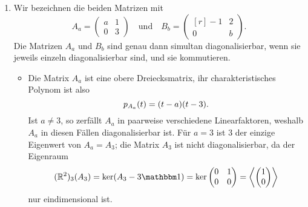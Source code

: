 \documentclass[a4paper, 10pt]{scrartcl}
\begin{document}
\begin{solution}
\begin{enumerate}
    \item
      Wir bezeichnen die beiden Matrizen mit
      \[
          A_a
        = \begin{pmatrix}
            a & 1 \\
            0 & 3
          \end{pmatrix}
        \quad\text{und}\quad
          B_b
        = \begin{pmatrix*}[r]
            -1  & 2 \\
             0  & b
          \end{pmatrix*}.
      \]
      Die Matrizen $A_a$ und $B_b$ sind genau dann simultan diagonalisierbar, wenn sie jeweils einzeln diagonalisierbar sind, und sie kommutieren.
      \begin{itemize}
        \item
          Die Matrix $A_a$ ist eine obere Dreiecksmatrix, ihr charakteristisches Polynom ist also
          \[
              p_{A_a}(t)
            = (t-a)(t-3).
          \]
          Ist $a \neq 3$, so zerfällt $A_a$ in paarweise verschiedene Linearfaktoren, weshalb $A_a$ in diesen Fällen diagonalisierbar ist.
          Für $a = 3$ ist $3$ der einzige Eigenwert von $A_a = A_3$;
          die Matrix $A_3$ ist nicht diagonalisierbar, da der Eigenraum
          \[
              \eigenspace{(\Real^2)}{A_3}{3}
            = \ker (A_3 - 3 \Id)
            = \ker \begin{pmatrix}
                     0 & 1  \\
                     0 & 0
                   \end{pmatrix}
            = \generated{ \vect{1 \\ 0} }
          \]
          nur eindimensional ist.
          

\end{itemize}
\end{enumerate}
\end{solution}
\end{document}
